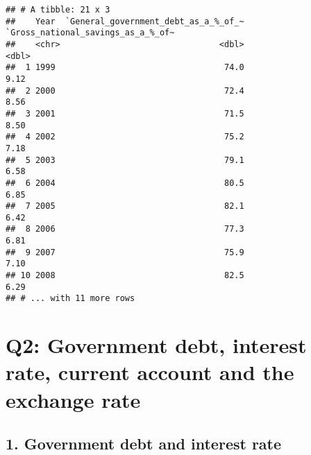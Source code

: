 \documentclass[
]{article}
\begin{document}
\begin{verbatim}
## # A tibble: 21 x 3
##    Year  `General_government_debt_as_a_%_of_~ `Gross_national_savings_as_a_%_of~
##    <chr>                                <dbl>                              <dbl>
##  1 1999                                  74.0                               9.12
##  2 2000                                  72.4                               8.56
##  3 2001                                  71.5                               8.50
##  4 2002                                  75.2                               7.18
##  5 2003                                  79.1                               6.58
##  6 2004                                  80.5                               6.85
##  7 2005                                  82.1                               6.42
##  8 2006                                  77.3                               6.81
##  9 2007                                  75.9                               7.10
## 10 2008                                  82.5                               6.29
## # ... with 11 more rows
\end{verbatim}

\hypertarget{q2-government-debt-interest-rate-current-account-and-the-exchange-rate}{%
\section{Q2: Government debt, interest rate, current account and the
exchange
rate}\label{q2-government-debt-interest-rate-current-account-and-the-exchange-rate}}

\hypertarget{government-debt-and-interest-rate}{%
\subsection{1. Government debt and interest
rate}\label{government-debt-and-interest-rate}}
\end{document}
